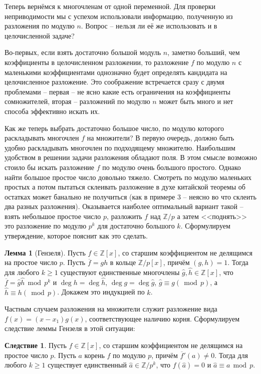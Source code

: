 \documentclass[10pt,a4paper,oneside]{book}
\theoremstyle{definition}
\newtheorem{lem}{Лемма}
\newtheorem{cor}{Следствие}
\renewcommand{\mod}{\,\operatorname{mod}\,}
\newcommand{\mb}[1]{\mathbb{#1}}
\newcommand{\ovl}{\overline}
\def\lm{\begin{lem}}
\def\elm{\end{lem}}
\def\crl{\begin{cor}}
\def\ecrl{\end{cor}}
\begin{document}
Теперь вернёмся к многочленам от одной переменной. Для проверки неприводимости мы с успехом использовали информацию, полученную из разложения по модулю $n$. Вопрос -- нельзя ли её же использовать и в целочисленной задаче? 

Во-первых, если взять достаточно большой модуль $n$, заметно больший, чем коэффициенты в целочисленном разложении, то разложение $f$ по модулю $n$ с маленькими коэффициентами однозначно будет определять кандидата на целочисленное разложение. Это соображение встречается сразу с двумя проблемами -- первая -- не ясно какие есть ограничения на коэффициенты сомножителей, вторая -- разложений по модулю $n$ может быть много и нет способа эффективно искать их.



Как же теперь выбрать достаточно большое число, по модулю которого раскладывать многочлен $f$ на множители? В первую очередь, должно быть удобно раскладывать многочлен по подходящему множителю. Наибольшим удобством в решении задачи разложения обладают поля. В этом смысле возможно стоило бы искать разложение $f$ по модулю очень большого простого. Однако найти большое простое число довольно тяжело. Смотреть по модулю маленьких простых а потом пытаться склеивать разложение в духе китайской теоремы об остатках может банально не получиться (как в примере 3 -- неясно во что склеить два разных разложения). Оказывается наиболее оптимальный вариант такой -- взять небольшое простое число $p$, разложить $f$ над $\mb Z/p$ а затем <<поднять>> это разложение по модулю $p^k$ для достаточно большого $k$. Сформулируем утверждение, которое пояснит как это сделать.

\lm[Гензеля] Пусть $f \in \mb Z[x]$, со старшим коэффициентом не делящимся на простое число $p$. Пусть $\ovl{f}=gh$ в кольце $\mb Z/p[x]$, причём $(g,h)=1$. Тогда  для любого $k\geq 1$ существуют единственные многочлены $\hat{g}, \hat{h} \in \mb Z[x]$, что $\ovl{f}=\hat{g} \hat{h} \mod p^k$  и $\deg h= \deg \hat{h}$, $\deg g= \deg \hat{g}$, $\hat{g}\equiv g (\mod p)$, а $\hat{h}\equiv h (\mod p)$.
\proof Докажем это индукцией по $k$. 
\endproof
\elm


Частным случаем разложения на множители служит разложение вида $f(x)=(x-x_1)g(x)$, соответствующее наличию корня. Сформулируем следствие леммы Гензеля в этой ситуации:


\crl Пусть $f \in \mb Z[x]$, со старшим коэффициентом не делящимся на простое число $p$. Пусть $a$ корень $f$ по модулю $p$, причём $\ovl{f}'(a)\neq 0$. Тогда  для любого $k\geq 1$ существует единственный $ \hat{a}\in \mb Z/p^k$,  что $f(\hat{a})=0$ и $\hat{a} \equiv a \mod p$.
\proof
\endproof
\ecrl
\end{document}
